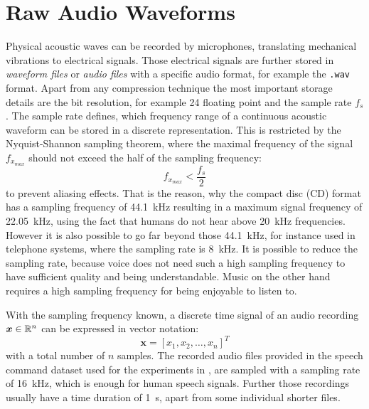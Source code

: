 
\section{Raw Audio Waveforms}\label{sec:signal_raw}
\thesisStateRevised
Physical acoustic waves can be recorded by microphones, translating mechanical vibrations to electrical signals. 
Those electrical signals are further stored in \emph{waveform files} or \emph{audio files} with a specific audio format, for example the \texttt{.wav} format.
Apart from any compression technique the most important storage details are the bit resolution, for example \SI{24}{\bit} floating point and the sample rate $f_s$. 
The sample rate defines, which frequency range of a continuous acoustic waveform can be stored in a discrete representation.
This is restricted by the Nyquist-Shannon sampling theorem, where the maximal frequency of the signal $f_{x_{max}}$ should not exceed the half of the sampling frequency: 
\begin{equation}\label{eq:signal_raw_nyquist}
  f_{x_{max}} < \frac{f_s}{2}
\end{equation}
to prevent aliasing effects.
That is the reason, why the compact disc (CD) format has a sampling frequency of \SI{44.1}{\kilo\hertz} resulting in a maximum signal frequency of \SI{22.05}{\kilo\hertz}, using the fact that humans do not hear above \SI{20}{\kilo\hertz} frequencies.
However it is also possible to go far beyond those \SI{44.1}{\kilo\hertz}, for instance used in telephone systems, where the sampling rate is \SI{8}{\kilo\hertz}.
It is possible to reduce the sampling rate, because voice does not need such a high sampling frequency to have sufficient quality and being understandable.
Music on the other hand requires a high sampling frequency for being enjoyable to listen to.

With the sampling frequency known, a discrete time signal of an audio recording $\bm{x} \in \mathbb{R}^n$ can be expressed in vector notation:
\begin{equation}\label{eq:signal_raw_x}
  \bm{x} = [x_1, x_2, \dots, x_n]^T
\end{equation}
with a total number of $n$ samples.
The recorded audio files provided in the speech command dataset \cite{Warden2018} used for the experiments in , are sampled with a sampling rate of \SI{16}{\kilo\hertz}, which is enough for human speech signals.
Further those recordings usually have a time duration of \SI{1}{\second}, apart from some individual shorter files.

